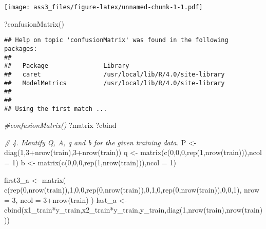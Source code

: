 \documentclass[
]{article}
\newenvironment{Shaded}{\begin{snugshade}}{\end{snugshade}}
\newcommand{\AttributeTok}[1]{\textcolor[rgb]{0.77,0.63,0.00}{#1}}
\newcommand{\CommentTok}[1]{\textcolor[rgb]{0.56,0.35,0.01}{\textit{#1}}}
\newcommand{\DecValTok}[1]{\textcolor[rgb]{0.00,0.00,0.81}{#1}}
\newcommand{\FunctionTok}[1]{\textcolor[rgb]{0.00,0.00,0.00}{#1}}
\newcommand{\NormalTok}[1]{#1}
\newcommand{\OtherTok}[1]{\textcolor[rgb]{0.56,0.35,0.01}{#1}}
\newcommand{\SpecialCharTok}[1]{\textcolor[rgb]{0.00,0.00,0.00}{#1}}
\begin{document}
\texttt{[image: ass3\_files/figure-latex/unnamed-chunk-1-1.pdf]}

\begin{Shaded}
\begin{Highlighting}[]
\NormalTok{?}\FunctionTok{confusionMatrix}\NormalTok{()}
\end{Highlighting}
\end{Shaded}

\begin{verbatim}
## Help on topic 'confusionMatrix' was found in the following packages:
## 
##   Package               Library
##   caret                 /usr/local/lib/R/4.0/site-library
##   ModelMetrics          /usr/local/lib/R/4.0/site-library
## 
## 
## Using the first match ...
\end{verbatim}

\begin{Shaded}
\begin{Highlighting}[]
\CommentTok{\#confusionMatrix()}
\NormalTok{?matrix}
\NormalTok{?cbind}

\CommentTok{\# 4. Identify Q, A, q and b for the given training data.}
\NormalTok{P }\OtherTok{\textless{}{-}} \FunctionTok{diag}\NormalTok{(}\DecValTok{1}\NormalTok{,}\DecValTok{3}\SpecialCharTok{+}\FunctionTok{nrow}\NormalTok{(train),}\DecValTok{3}\SpecialCharTok{+}\FunctionTok{nrow}\NormalTok{(train))}
\NormalTok{q }\OtherTok{\textless{}{-}} \FunctionTok{matrix}\NormalTok{(}\FunctionTok{c}\NormalTok{(}\DecValTok{0}\NormalTok{,}\DecValTok{0}\NormalTok{,}\DecValTok{0}\NormalTok{,}\FunctionTok{rep}\NormalTok{(}\DecValTok{1}\NormalTok{,}\FunctionTok{nrow}\NormalTok{(train))),}\AttributeTok{ncol =} \DecValTok{1}\NormalTok{)}
\NormalTok{b }\OtherTok{\textless{}{-}} \FunctionTok{matrix}\NormalTok{(}\FunctionTok{c}\NormalTok{(}\DecValTok{0}\NormalTok{,}\DecValTok{0}\NormalTok{,}\DecValTok{0}\NormalTok{,}\FunctionTok{rep}\NormalTok{(}\DecValTok{1}\NormalTok{,}\FunctionTok{nrow}\NormalTok{(train))),}\AttributeTok{ncol =} \DecValTok{1}\NormalTok{)}

\NormalTok{first3\_a }\OtherTok{\textless{}{-}} \FunctionTok{matrix}\NormalTok{(}
  \FunctionTok{c}\NormalTok{(}\FunctionTok{rep}\NormalTok{(}\DecValTok{0}\NormalTok{,}\FunctionTok{nrow}\NormalTok{(train)),}\DecValTok{1}\NormalTok{,}\DecValTok{0}\NormalTok{,}\DecValTok{0}\NormalTok{,}\FunctionTok{rep}\NormalTok{(}\DecValTok{0}\NormalTok{,}\FunctionTok{nrow}\NormalTok{(train)),}\DecValTok{0}\NormalTok{,}\DecValTok{1}\NormalTok{,}\DecValTok{0}\NormalTok{,}\FunctionTok{rep}\NormalTok{(}\DecValTok{0}\NormalTok{,}\FunctionTok{nrow}\NormalTok{(train)),}\DecValTok{0}\NormalTok{,}\DecValTok{0}\NormalTok{,}\DecValTok{1}\NormalTok{),}
  \AttributeTok{nrow =} \DecValTok{3}\NormalTok{, }\AttributeTok{ncol =} \DecValTok{3}\SpecialCharTok{+}\FunctionTok{nrow}\NormalTok{(train)}
\NormalTok{)}
\NormalTok{last\_a }\OtherTok{\textless{}{-}} \FunctionTok{cbind}\NormalTok{(x1\_train}\SpecialCharTok{*}\NormalTok{y\_train,x2\_train}\SpecialCharTok{*}\NormalTok{y\_train,y\_train,}\FunctionTok{diag}\NormalTok{(}\DecValTok{1}\NormalTok{,}\FunctionTok{nrow}\NormalTok{(train),}\FunctionTok{nrow}\NormalTok{(train)))}


\end{Highlighting}
\end{Shaded}
\end{document}
